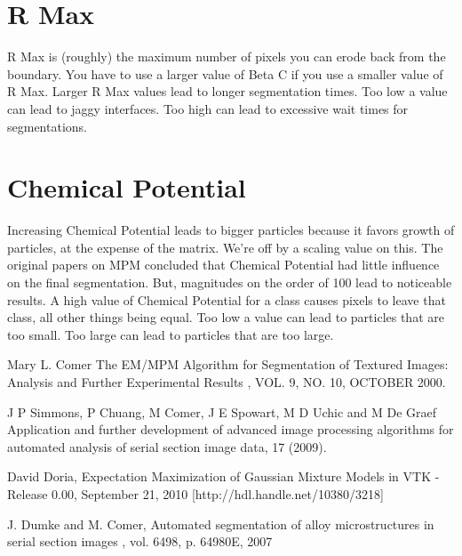 \documentclass[12pt,oneside]{book}
\begin{document}
\section{R Max}
R Max is (roughly) the maximum number of pixels you can erode back from the boundary. You have to use a larger value of Beta C if you use a smaller value of R Max. Larger R Max values lead to longer segmentation times. Too low a value can lead to jaggy interfaces. Too high can lead to excessive wait times for segmentations.
\section{Chemical Potential}
Increasing Chemical Potential leads to bigger particles because it favors growth of particles, at the expense of the matrix. We're off by a scaling value on this. The original papers on MPM concluded that Chemical Potential had little influence on the final segmentation. But, magnitudes on the order of 100 lead to noticeable results. A high value of Chemical Potential for a class causes pixels to leave that class, all other things being equal. Too low a value can lead to particles that are too small. Too large can lead to particles that are too large.

\newpage
\begin{thebibliography}{4}

Mary L. Comer
\newblock The EM/MPM Algorithm for Segmentation of Textured Images: Analysis and Further Experimental Results
, VOL. 9, NO. 10, OCTOBER 2000.


J P Simmons, P Chuang, M Comer, J E Spowart, M D Uchic and M De Graef
\newblock Application and further development of advanced image processing algorithms for automated analysis of serial section image data, 
 17 (2009). 


David Doria, 
\newblock Expectation Maximization of Gaussian Mixture Models in VTK - Release 0.00, September 21, 2010
 [http://hdl.handle.net/10380/3218] 


J. Dumke and M. Comer, 
\newblock Automated segmentation of alloy microstructures in serial section images
, vol. 6498, p. 64980E, 2007

\end{thebibliography}
% 

\printindex
\end{document}

